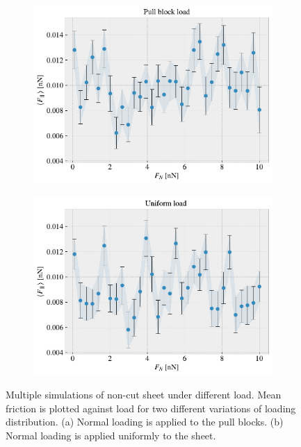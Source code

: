 \begin{figure}[H]
  \centering
  \begin{subfigure}[t]{0.49\textwidth}
      \centering
      \includegraphics[width=\textwidth]{figures/baseline/load_dist_a.pdf}
      \caption{}
      \label{fig:load_dist_a}
  \end{subfigure}
  \hfill
  \begin{subfigure}[t]{0.49\textwidth}
      \centering
      \includegraphics[width=\textwidth]{figures/baseline/load_dist_b.pdf}
      \caption{}
      \label{fig:load_dist_b}
  \end{subfigure}
  \hfill
     \caption{Multiple simulations of non-cut sheet under different load. Mean friction is plotted against load for two different variations of loading distribution. (a) Normal loading is applied to the pull blocks. (b) Normal loading is applied uniformly to the sheet. }
     \label{fig:load_dist}
\end{figure}

